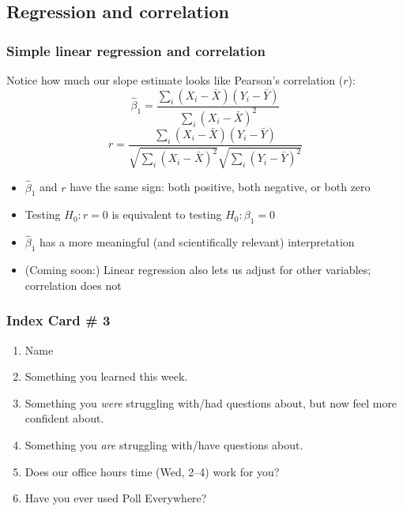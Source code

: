 \documentclass[12pt, 
hyperref={colorlinks=true, linkcolor=blue, urlcolor=cyan}]{beamer}
\begin{document}
\subsection{Regression and correlation}
\begin{frame}
\frametitle{Simple linear regression and correlation}

Notice how much our slope estimate looks like Pearson's correlation ($r$): 
$$\hat\beta_1 = \frac{\sum_i \left(X_i - \bar{X}\right)\left(Y_i - \bar{Y}\right)}{\sum_i \left(X_i - \bar{X}\right)^2}$$
$$r = \frac{\sum_i \left(X_i - \bar{X}\right)\left(Y_i - \bar{Y}\right)}{\sqrt{\sum_i\left(X_i - \bar{X}\right)^2} \sqrt{\sum_i \left(Y_i - \bar{Y}\right)^2}}$$ \pause

\begin{itemize}\vspace{-0.3cm}
\item $\hat\beta_1$ and $r$ have the same sign: both positive, both negative, or both zero
\item Testing $H_0: r = 0$ is equivalent to testing $H_0: \beta_1 = 0$
\item $\hat\beta_1$ has a more meaningful (and scientifically relevant) interpretation
\item (Coming soon:) Linear regression also lets us adjust for other variables; correlation does not
\end{itemize}

\end{frame}


\begin{frame}
\frametitle{Index Card \# 3}

\begin{enumerate}
\item Name
\item Something you learned this week.
\item Something you \textit{were} struggling with/had questions about, but now feel more confident about.
\item Something you \textit{are} struggling with/have questions about.
\item Does our office hours time (Wed, 2--4) work for you?
\item Have you ever used Poll Everywhere?
\end{enumerate}

\end{frame}
\end{document}
